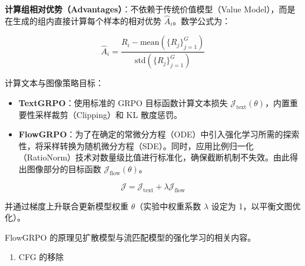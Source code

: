 \textbf{计算组相对优势（Advantages）}：不依赖于传统价值模型（Value Model），而是在生成的组内直接计算每个样本的相对优势 \(\hat A_i\)。数学公式为：

\[
\hat A_i=
\frac{R_i-\mathrm{mean}(\{R_j\}_{j=1}^{G})}
{\mathrm{std}(\{R_j\}_{j=1}^{G})}
\]

计算文本与图像策略目标：

\begin{itemize}
\tightlist
\item
  \textbf{TextGRPO}：使用标准的 GRPO 目标函数计算文本损失 \(\mathcal{J}_{\mathrm{text}}(\theta)\)，内置重要性采样裁剪（Clipping）和 KL 散度惩罚。
\item
  \textbf{FlowGRPO}：为了在确定的常微分方程（ODE）中引入强化学习所需的探索性，将采样转换为随机微分方程（SDE）。同时，应用比例归一化（RatioNorm）技术对数量级比值进行标准化，确保截断机制不失效。由此得出图像部分的目标函数 \(\mathcal{J}_{\mathrm{flow}}(\theta)\)。
\end{itemize}

\[
\mathcal{J}
=\mathcal{J}_{\mathrm{text}}+\lambda\mathcal{J}_{\mathrm{flow}}
\]

并通过梯度上升联合更新模型权重 \(\theta\)（实验中权重系数 \(\lambda\) 设定为 1，以平衡文图优化）。

FlowGRPO 的原理见扩散模型与流匹配模型的强化学习的相关内容。

\begin{enumerate}
\def\labelenumi{\arabic{enumi}.}
\setcounter{enumi}{2}
\tightlist
\item
  CFG 的移除
\end{enumerate}

